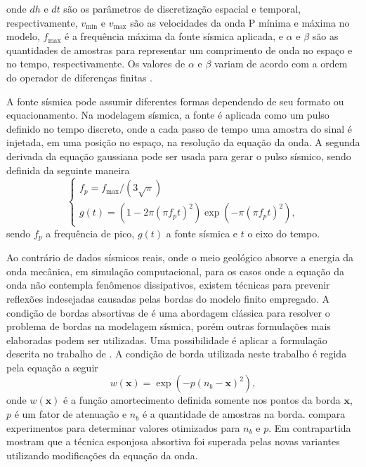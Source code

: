 \noindent onde $dh$ e $dt$ são os parâmetros de discretização espacial e temporal, respectivamente, $v_{\text{min}}$ e $v_{\text{max}}$ são as velocidades da onda P mínima e máxima no modelo, $f_{\text{max}}$ é a frequência máxima da fonte sísmica aplicada, e $\alpha$ e $\beta$ são as quantidades de amostras para representar um comprimento de onda no espaço e no tempo, respectivamente. Os valores de $\alpha$ e $\beta$ variam de acordo com a ordem do operador de diferenças finitas \cite{moczo2000stability, bulcao2004modelagem}.    

A fonte sísmica pode assumir diferentes formas dependendo de seu formato ou equacionamento. Na modelagem sísmica, a fonte é aplicada como um pulso definido no tempo discreto, onde a cada passo de tempo uma amostra do sinal é injetada, em uma posição no espaço, na resolução da equação da onda. A segunda derivada da equação gaussiana \cite{ricker1953form} pode ser usada para gerar o pulso sísmico, sendo definida da seguinte maneira
\begin{equation}
	\begin{cases}
		f_p = f_{\text{max}} / (3\sqrt{\pi}) \\
		g(t) = (1 - 2 \pi (\pi f_p t)^2) \exp(-\pi (\pi f_p t)^2),
		\label{ricker}
	\end{cases}
\end{equation}
\noindent sendo $f_p$ a frequência de pico, $g(t)$ a fonte sísmica e $t$ o eixo do tempo. 

Ao contrário de dados sísmicos reais, onde o meio geológico absorve a energia da onda mecânica, em simulação computacional, para os casos onde a equação da onda não contempla fenômenos dissipativos, existem técnicas para prevenir reflexões indesejadas causadas pelas bordas do modelo finito empregado. A condição de bordas absortivas de  é uma abordagem clássica para resolver o problema de bordas na modelagem sísmica, porém outras formulações mais elaboradas podem ser utilizadas. Uma possibilidade é aplicar a formulação descrita no trabalho de . A condição de borda utilizada neste trabalho é regida pela equação a seguir
\begin{equation}
	w(\mathbf{x}) = \exp(- p(n_b - \mathbf{x})^2),
	\label{cerjan}	
\end{equation}      
\noindent onde $w(\mathbf{x})$ é a função amortecimento definida somente nos pontos da borda $\mathbf{x}$, $p$ é um fator de atenuação e $n_b$ é a quantidade de amostras na borda.  compara experimentos para determinar valores otimizados para $n_b$ e $p$. Em contrapartida  mostram que a técnica esponjosa absortiva foi superada pelas novas variantes utilizando modificações da equação da onda. 

